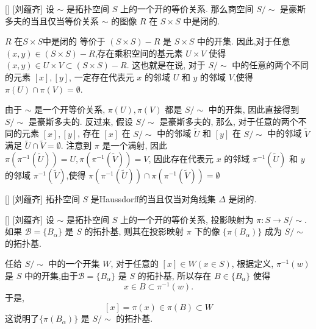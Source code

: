 \documentclass[UTF8]{ctexart}
\begin{document}
        \begin{thm}
            {}
            []
            [刘蕴齐]
            设 \( \sim \) 是拓扑空间 \( S \) 上的一个开的等价关系. 那么商空间 \( S/\sim \) 是豪斯多夫的当且仅当等价关系 \( \sim \) 的图像 \( R \) 在 \( S \times S \) 中是闭的. 
        \end{thm}

        \begin{prf}
             \(R\) 在\( S \times S \)中是闭的 等价于 
             \((S \times S) - R\) 是 \(S \times S\) 中的开集. 因此,对于任意 \((x,y) \in (S \times S) - R\),存在乘积空间的基元素 \(U \times V\) 使得 \((x,y) \in U \times V \subset (S \times S) - R\). 这也就是在说, 对于 \(S / \sim\) 中的任意的两个不同的元素 \([x],[y]\), 一定存在代表元 \(x\) 的邻域 \(U\) 和 \(y\) 的邻域 \(V\),使得 \(\pi(U) \cap \pi(V) = \emptyset\). 
            
            由于 \(\sim\) 是一个开等价关系,  \(\pi(U), \pi(V)\) 都是 \(S/\sim\) 中的开集, 因此直接得到 \(S/\sim\) 是豪斯多夫的. 反过来, 假设 \(S/\sim\) 是豪斯多夫的, 那么, 对于任意的两个不同的元素 \([x],[y]\), 存在 \([x]\) 在 \(S/\sim\) 中的邻域 \(\tilde{U}\) 和 \([y]\) 在 \(S/\sim\) 中的邻域 \(\tilde{V}\) 满足 \(\tilde{U} \cap \tilde{V} = \emptyset\). 注意到 \(\pi\) 是一个满射, 因此 \(\pi(\pi^{-1}(\tilde{U})) = U, \pi(\pi^{-1}(\tilde{V})) = V\), 因此存在代表元 \(x\) 的邻域 \(\pi^{-1}(\tilde{U})\) 和 \(y\) 的邻域 \(\pi^{-1}(\tilde{V})\),使得 \(\pi(\pi^{-1}(\tilde{U})) \cap \pi(\pi^{-1}(\tilde{V})) = \emptyset\) 
        \end{prf}
        
        \begin{crl}
            []
            {}
            []
            [刘蕴齐]
            拓扑空间 \(S\) 是Haussdorff的当且仅当对角线集 \(\Delta\) 是闭的. 
        \end{crl}

        \begin{thm}
            []
            {}
            []
            [刘蕴齐]
            设 \( \sim \) 是拓扑空间 \( S \) 上的一个开的等价关系, 投影映射为 \( \pi: S \to S/\sim \). 
            如果 \( \mathcal{B} = \{ B_{\alpha} \} \) 是 \( S \) 的拓扑基, 则其在投影映射 \( \pi \) 下的像 \( \{ \pi(B_{\alpha}) \} \) 成为 \( S/\sim \) 的拓扑基. 
        \end{thm}
        
        \begin{prf}
            任给 \(S/\sim\) 中的一个开集 \(W\), 对于任意的 \([x] \in W(x \in S)\), 根据定义,  \(\pi^{-1}(w)\) 是 \(S\) 中的开集,由于\( \mathcal{B} = \{ B_{\alpha} \} \) 是 \( S \) 的拓扑基, 所以存在 \(B \in \{ B_{\alpha} \}\) 使得
            \[
                x \in B \subset \pi^{-1}(w).
            \]
            于是,
            \[
                [x] = \pi(x) \in \pi(B) \subset W
            \]
            这说明了\( \{ \pi(B_{\alpha}) \} \) 是 \( S/\sim \) 的拓扑基. 
        \end{prf}
\end{document}

